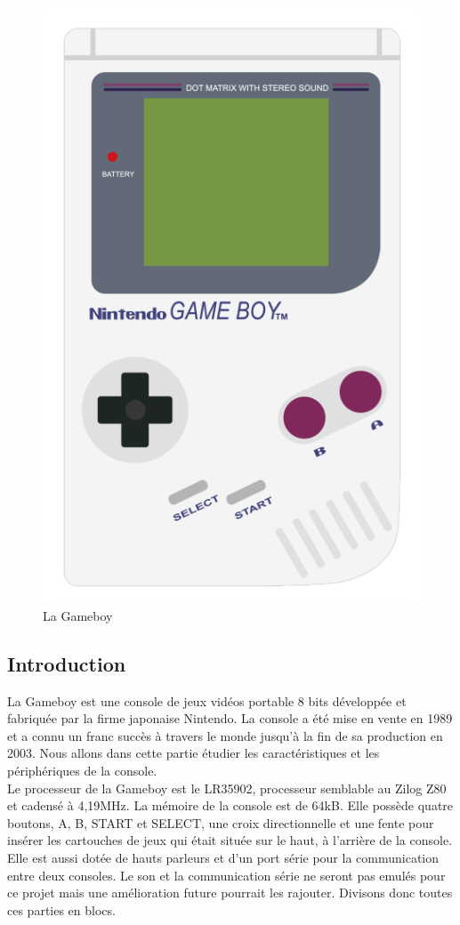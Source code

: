 \documentclass[a4paper]{article}
\begin{document}
\begin{figure}[!h]
  \centering
  \includegraphics[scale=0.5]{images/gameboy.png}
  \caption{La Gameboy}
\end{figure}

\subsection{Introduction}
La Gameboy est une console de jeux vidéos portable 8 bits développée et fabriquée
par la firme japonaise Nintendo. La console a été mise en vente en 1989 et a connu
un franc succès à travers le monde jusqu'à la fin de sa production en 2003.
Nous allons dans cette partie étudier les caractéristiques et les périphériques
de la console. \\

Le processeur de la Gameboy est le LR35902, processeur semblable au Zilog Z80 et
cadensé à 4,19MHz. La mémoire de la console est de 64kB. Elle possède quatre boutons, 
A, B, START et SELECT, une croix directionnelle et une fente pour insérer les 
cartouches de jeux qui était située sur le haut, à l'arrière de la console. Elle est
aussi dotée de hauts parleurs et d'un port série pour la communication entre deux
consoles. Le son et la communication série ne seront pas emulés pour ce projet
mais une amélioration future pourrait les rajouter. Divisons donc toutes ces parties
en blocs.
\end{document}
